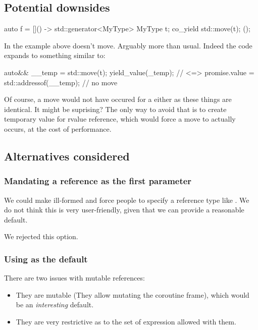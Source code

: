 \documentclass{wg21}
\begin{document}
\subsection{Potential downsides}
\begin{colorblock}
auto f = []() -> std::generator<MyType> {
    MyType t;
    co_yield std::move(t);
}();
\end{colorblock}

In the example above  doesn't move. Arguably more than usual.
Indeed the code expands to something similar to:

\begin{colorblock}
auto&& __temp = std::move(t);
yield_value(_temp); // <=> promise.value = std::addressof(__temp); // no move
\end{colorblock}

Of course, a move would not have occured for a  either as these things are identical.
It might be suprising?
The only way to avoid that is to create temporary value for rvalue reference, which would force a move to actually occurs,
at the cost of performance.


\subsection{Alternatives considered}

\subsubsection{Mandating a reference as the first parameter}

We could make  ill-formed and force people to specify a reference type like .
We do not think this is very user-friendly, given that we can provide a reasonable default.

We rejected this option.

\subsubsection{Using  as the default}

There are two issues with mutable references:
\begin{itemize}
\item They are mutable (They allow mutating the coroutine frame), which would be an \emph{interesting} default.
\item They are very restrictive as to the set of  expression allowed with them.
\end{itemize}
\end{document}
